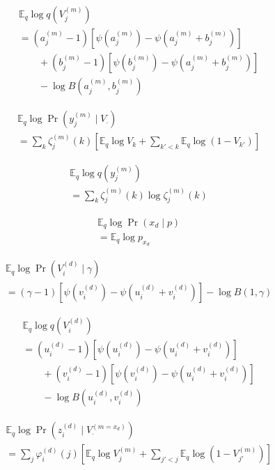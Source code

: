 \documentclass{article}
\newcommand{\digamma}[1]{\ensuremath{\psi\left(#1\right)}}
\newcommand{\Eq}{\ensuremath{\mathbb{E}_q\xspace}}
\begin{document}
\begin{align*}
    &\Eq \log q(V_j^{(m)}) \\
    &= (a_j^{(m)} - 1) \left[ \digamma{a_j^{(m)}} - \digamma{a_j^{(m)} + b_j^{(m)}} \right] \\
    &\qquad + (b_j^{(m)} - 1) \left[ \digamma{b_j^{(m)}} - \digamma{a_j^{(m)} + b_j^{(m)}} \right] \\
    &\qquad - \log B(a_j^{(m)}, b_j^{(m)})
\end{align*}

\begin{align*}
    &\Eq \log \Pr(y_j^{(m)} \mid V_\cdot) \\
    &= \sum_k \zeta_j^{(m)}(k) \left[ \Eq \log V_k + \sum_{k'<k} \Eq \log (1-V_{k'}) \right]
\end{align*}

\begin{align*}
    &\Eq \log q(y_j^{(m)}) \\
    &= \sum_k \zeta_j^{(m)}(k) \log \zeta_j^{(m)}(k)
\end{align*}

\begin{align*}
    &\Eq \log \Pr(x_d \mid p) \\
    &= \Eq \log p_{x_d}
\end{align*}

\begin{align*}
    &\Eq \log \Pr(V_i^{(d)} \mid \gamma) \\
    &= (\gamma - 1) \left[ \digamma{v_i^{(d)}} - \digamma{u_i^{(d)} + v_i^{(d)}} \right] - \log B(1, \gamma)
\end{align*}

\begin{align*}
    &\Eq \log q(V_i^{(d)}) \\
    &= (u_i^{(d)} - 1) \left[ \digamma{u_i^{(d)}} - \digamma{u_i^{(d)} + v_i^{(d)}} \right] \\
    &\qquad + (v_i^{(d)} - 1) \left[ \digamma{v_i^{(d)}} - \digamma{u_i^{(d)} + v_i^{(d)}} \right] \\
    &\qquad - \log B(u_i^{(d)}, v_i^{(d)})
\end{align*}

\begin{align*}
    &\Eq \log \Pr(z_i^{(d)} \mid V^{(m=x_d)}_\cdot) \\
    &= \sum_j \varphi_i^{(d)}(j) \left[ \Eq \log V^{(m)}_j + \sum_{j'<j} \Eq \log (1-V^{(m)}_{j'}) \right]
\end{align*}
\end{document}
